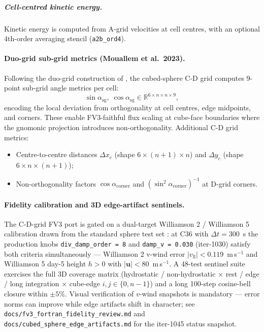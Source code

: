 \documentclass[11pt,twoside]{report}
\newcommand{\vect}[1]{\bm{#1}}
\begin{document}
\subparagraph{Cell-centred kinetic energy.}
Kinetic energy is computed from A-grid velocities at cell centres, with
an optional 4th-order averaging stencil (\texttt{a2b\_ord4}).

\paragraph{Duo-grid sub-grid metrics (Mouallem et al.\ 2023).}
Following the duo-grid construction of \citet{Mouallem2023}, the cubed-sphere
C-D grid computes 9-point sub-grid angle metrics per cell:
\begin{equation}
  \sin\alpha_{\mathrm{sg}},\;\cos\alpha_{\mathrm{sg}} \in \mathbb{R}^{6 \times n \times n \times 9},
\end{equation}
encoding the local deviation from orthogonality at cell centres, edge
midpoints, and corners.  These enable FV3-faithful flux scaling at
cube-face boundaries where the gnomonic projection introduces
non-orthogonality.  Additional C-D grid metrics:
\begin{itemize}[nosep]
  \item Centre-to-centre distances $\Delta x_c$ (shape $6 \times (n\!+\!1) \times n$)
    and $\Delta y_c$ (shape $6 \times n \times (n\!+\!1)$);
  \item Non-orthogonality factors $\cos\alpha_{\mathrm{corner}}$ and
    $(\sin^2\!\alpha_{\mathrm{corner}})^{-1}$ at D-grid corners.
\end{itemize}

\paragraph{Fidelity calibration and 3D edge-artifact sentinels.}
The C-D-grid FV3 port is gated on a dual-target Williamson 2 / Williamson 5
calibration drawn from the standard sphere test set
\citep{Williamson1992}: at C36 with $\Delta t=300$~s the production knobs
\texttt{div\_damp\_order = 8} and \texttt{damp\_v = 0.030} (iter-1030)
satisfy both criteria simultaneously --- Williamson 2 v-wind error
$|v_{\mathrm{ll}}|<0.119$~m\,s$^{-1}$ and Williamson 5 day-5 height
$h>0$ with $|\vect{u}|<80$~m\,s$^{-1}$.  A 48-test sentinel suite
exercises the full 3D coverage matrix
(hydrostatic / non-hydrostatic $\times$ rest / edge / long
integration $\times$ cube-edge $i,j\in\{0,n{-}1\}$) and a long
100-step cosine-bell closure within $\pm 5\%$.  Visual verification
of $v$-wind snapshots is mandatory --- error norms can improve while
edge artifacts shift in character; see \texttt{docs/fv3\_fortran\_fidelity\_review.md}
and \texttt{docs/cubed\_sphere\_edge\_artifacts.md} for the iter-1045
status snapshot.
\end{document}
